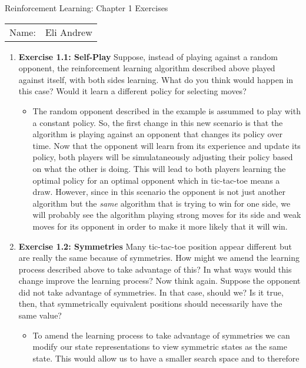 \documentclass[12pt]{article}
\begin{document}
\begin{center}
{\Large Reinforcement Learning: Chapter 1 Exercises}

\begin{tabular}{rl}
Name: & Eli Andrew
\end{tabular}
\end{center}

\begin{enumerate}[label=(\alph*)]
  \item \textbf{Exercise 1.1: Self-Play} Suppose, instead of playing against a random opponent, 
  the reinforcement learning algorithm described above played against itself, 
  with both sides learning. What do you think would happen in this case? 
  Would it learn a different policy for selecting moves?
  \begin{itemize}
    \item The random opponent described in the example is assummed to play with 
    a constant policy. So, the first change in this new scenario is that the 
    algorithm is playing against an opponent that changes its policy over time.
    Now that the opponent will learn from its experience and update its policy,
    both players will be simulataneously adjusting their policy based on what the 
    other is doing. This will lead to both players learning the optimal policy for
    an optimal opponent which in tic-tac-toe means a draw. However, since in this
    scenario the opponent is not just another algorithm but the \textit{same} algorithm
    that is trying to win for one side, we will probably see the algorithm playing 
    strong moves for its side and weak moves for its opponent in order to make it
    more likely that it will win.
  \end{itemize}
  \item \textbf{Exercise 1.2: Symmetries} Many tic-tac-toe position appear different but are 
  really the same because of symmetries. How might we amend the learning process described above
  to take advantage of this? In what ways would this change improve the learning process? Now think
  again. Suppose the opponent did not take advantage of symmetries. In that case, should we? Is it true,
  then, that symmetrically equivalent positions should necessarily have the same value?
  \begin{itemize}
    \item To amend the learning process to take advantage of symmetries we can modify our state representations
    to view symmetric states as the same state. This would allow us to have a smaller search space and to therefore

\end{itemize}
\end{enumerate}
\end{document}
